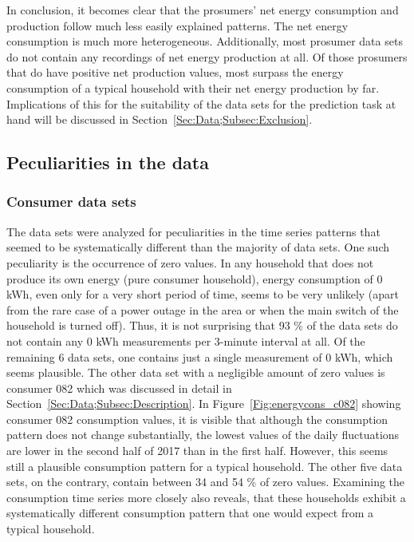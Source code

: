 In conclusion, it becomes clear that the prosumers' net energy consumption and production follow much less easily explained patterns. The net energy consumption is much more heterogeneous. Additionally, most prosumer data sets do not contain any recordings of net energy production at all. Of those prosumers that do have positive net production values, most surpass the energy consumption of a typical household with their net energy production by far. Implications of this for the suitability of the data sets for the prediction task at hand will be discussed in Section~\ref{Sec:Data;Subsec:Exclusion}.


\subsection{Peculiarities in the data}\label{Sec:Data;Subsec:Peculiarities}

\subsubsection{Consumer data sets}

The data sets were analyzed for peculiarities in the time series patterns that seemed to be systematically different than the majority of data sets. One such peculiarity is the occurrence of zero values. In any household that does not produce its own energy (pure consumer household), energy consumption of 0 kWh, even only for a very short period of time, seems to be very unlikely (apart from the rare case of a power outage in the area or when the main switch of the household is turned off). Thus, it is not surprising that 93 \% of the data sets do not contain any 0 kWh measurements per 3-minute interval at all. Of the remaining 6 data sets, one contains just a single measurement of 0 kWh, which seems plausible. The other data set with a negligible amount of zero values is consumer 082 which was discussed in detail in Section~\ref{Sec:Data;Subsec:Description}. In Figure~\ref{Fig:energycons_c082} showing consumer 082 consumption values, it is visible that although the consumption pattern does not change substantially, the lowest values of the daily fluctuations are lower in the second half of 2017 than in the first half. However, this seems still a plausible consumption pattern for a typical household. The other five data sets, on the contrary, contain between 34 and 54 \% of zero values. Examining the consumption time series more closely also reveals, that these households exhibit a systematically different consumption pattern that one would expect from a typical household.

